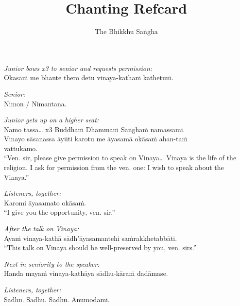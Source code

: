 \documentclass[10pt,oneside]{memoir}
\title{Chanting Refcard}
\author{The Bhikkhu Saṅgha}
\begin{document}
\begin{hangparas}{1em}{1}

\emph{Junior bows x3 to senior and requests permission:}\\
Okāsaṁ me bhante thero detu vinaya-kathaṁ kathetuṁ.

\emph{Senior:}\\
Nimon / Nimantana.

\emph{Junior gets up on a higher seat:}\\
Namo tassa\ldots{} x3 Buddhaṁ Dhammaṁ Saṅghaṁ namassāmi.\\
Vinayo sāsanassa āyūti karotu me āyasamā okāsaṁ ahan-taṁ\\ vattukāmo.\\[5pt]
``Ven. sir, please give permission to speak on Vinaya\ldots{} Vinaya is the
life of the religion. I ask for permission from the ven. one: I wish
to speak about the Vinaya.''

\emph{Listeners, together:}\\
Karomi āyasamato okāsaṁ.\\[5pt]
``I give you the opportunity, ven. sir.''

\emph{After the talk on Vinaya:}\\
Ayaṁ vinaya-kathā sādh'āyasamantehi saṁrakkhetabbāti.\\[5pt]
``This talk on Vinaya should be well-preserved by you, ven. sirs.''

\emph{Next in seniority to the speaker:}\\
Handa mayaṁ vinaya-kathāya sādhu-kāraṁ dadāmase.

\emph{Listeners, together:}\\
Sādhu. Sādhu. Sādhu. Anumodāmi.

\end{hangparas}
\end{document}
